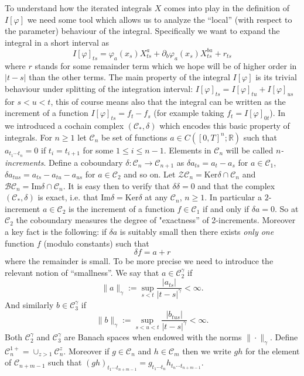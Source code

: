 \documentclass[a4paper]{article}
\newcommand{\1}{{\bf 1}}
\newcommand{\der}{\delta}
\newcommand{\RR}{\mathbb{R}}
\newcommand{\CC}{\mathcal{C}}
\newcommand{\BB}{\mathcal{B}}
\newcommand{\ZZ}{\mathcal{Z}}
\newcommand{\ZCC}{\ZZ\CC}
\newcommand{\BCC}{\BB\CC}
\newcommand{\CC}{\mathcal{C}}
\newcommand{\RR}{\mathbb{R}}
\newcommand{\der}{\delta}
\begin{document}
To understand how the iterated integrals $X$ comes into play in the
definition of $I[\varphi]$ we need some tool which allows us to
analyze the ``local'' (with respect to the parameter) behaviour of the
integral. Specifically we want to expand the integral in a short
interval as
\begin{equation}
  \label{eq:expansion-of-I}
I[\varphi]_{ts} = \varphi_a(x_s) X^a_{ts} + \partial_b
\varphi_a(x_s) X^{b a}_{ts} + r_{ts}  
\end{equation}
where $r$ stands for some remainder term which we hope will be of
higher order in $|t-s|$ than the other terms. The main property of the
integral $I[\varphi]$ is its trivial behaviour under splitting of the
integration interval: $I[\varphi]_{ts} = I[\varphi]_{tu} +
I[\varphi]_{us}$ for $s < u < t$, this of course means also that the
integral can be written as the increment of a function
$I[\varphi]_{ts} = f_t - f_s$ (for example taking $f_t =
I[\varphi]_{0t}$). In~\cite{MR2091358} we introduced a cochain complex
$(\CC_*,\delta)$ which encodes this basic property of integrals. For
$n \ge 1$ let
$\CC_n$ be set of functions $a\in C([0,T]^n;\RR)$  such that $a_{t_1
  \cdots t_n} = 0$ if $t_i = t_{i+1}$ for some $1 \le i \le
n-1$. Elements in $\CC_n$ will be called \emph{$n$-increments}. 
Define a coboundary $\der : \CC_n \to \CC_{n+1}$ as $\der a_{ts}
= a_t-a_s$ for $a \in \CC_1$, $\der a _{tus} = a_{ts}-a_{tu}-a_{us}$
for $a\in \CC_2$ and so on. Let $\ZCC_n = \textrm{Ker} \der \cap
\CC_n$  and $\BCC_n = \textrm{Im} \der \cap \CC_n$. It is easy then to verify that $\der \der
= 0$ and that the complex $(\CC_*,\der)$ is exact, i.e. that
$\text{Im} \der = \text{Ker} \der$ at any $\CC_n$, $n \ge 1$. In
particular a $2$-increment $a\in\CC_2$ is  the increment of a function
$f \in \CC_1$ if and only if $\der a = 0$. So at $\CC_2$ the
coboundary measures the degree of "exactness'' of 2-increments.
Moreover a key fact is the following: if $\der a$ is suitably small
then there exists \emph{only one} function $f$ (modulo constants) such
that
\begin{equation}
  \label{eq:basic-decomp}
\der f = a + r
\end{equation}
where the remainder is small. To be more precise we need to introduce
the relevant notion of ``smallness''. We say that $a\in \CC_2^\gamma$
if 
$$
\|a\|_\gamma := \sup_{s<t} \frac{|a_{ts}|}{|t-s|^\gamma} < \infty .
$$
And similarly $b \in \CC_3^\gamma$ if
$$
\|b\|_\gamma := \sup_{s<u<t} \frac{|b_{tus}|}{|t-s|^\gamma} < \infty .
$$
Both $\CC_2^{\gamma}$ and $\CC_3^\gamma$ are Banach spaces when
endowed with the norms $\|\cdot\|_\gamma$. Define $\CC_n^{1+} =
\cup_{z > 1} \CC_n^z$.  Moreover if $g \in \CC_n$ and $h \in \CC_m$ then we write $gh$ for the element of $\CC_{n+m-1}$ such that
$(gh)_{t_1 \cdots t_{n+m-1}} = g_{t_1 \cdots t_n} h_{t_n \cdots t_{n+m-1}}$.
\end{document}
